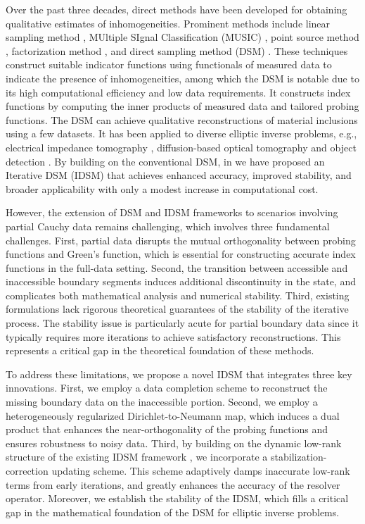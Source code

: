 \documentclass[onefignum,onetabnum]{siamart190516}
\numberwithin{equation}{section}
\begin{document}
Over the past three decades, direct methods have been developed for obtaining qualitative estimates of inhomogeneities.
Prominent methods include linear sampling method \cite{Kirsch1996}, MUltiple SIgnal Classification (MUSIC) \cite{AmmariCalmon:2008,Devaney2004,AmmariLesselier:2005}, point source method \cite{Potthast1998}, factorization method \cite{Kirsch1998}, and direct sampling method (DSM) \cite{ItoJinZou:2012}.
These techniques construct suitable indicator functions using functionals of measured data to indicate the presence of inhomogeneities, among which the DSM is notable due to its high computational efficiency and low data requirements.
It constructs index functions by computing the inner products of measured data and tailored probing functions. The DSM can achieve qualitative reconstructions of material inclusions using a few datasets.
It has been applied to diverse elliptic inverse problems, e.g., electrical impedance tomography \cite{Zou2014}, diffusion-based optical tomography \cite{Zou2015} and object detection \cite{Sun2023}.
By building on the conventional DSM, {in \cite{Ito2025Iterative}} we have proposed an Iterative DSM (IDSM) that achieves enhanced accuracy, improved stability, and broader applicability with only a modest increase in computational cost.

However, the extension of DSM and IDSM frameworks to scenarios involving partial Cauchy data remains challenging, which involves three fundamental challenges.
First, partial data disrupts the mutual orthogonality between probing functions and Green's function, which is essential for constructing accurate index functions in the full-data setting.
Second, the transition between accessible and inaccessible boundary segments induces additional discontinuity in the state, and complicates both mathematical analysis and numerical stability.
Third, existing formulations lack rigorous theoretical guarantees of the stability of the iterative process.
{The stability issue is particularly acute for partial boundary data since it typically requires more iterations to achieve satisfactory reconstructions.}
This represents a critical gap in the theoretical foundation of these methods.

To address these limitations, we propose a novel IDSM that integrates three key innovations.
First, we employ a data completion scheme to reconstruct the missing boundary data on the inaccessible portion. %
Second, we employ a heterogeneously regularized Dirichlet-to-Neumann map, which induces a dual product that enhances the near-orthogonality of the probing functions and ensures robustness to noisy data.
Third, by building on the dynamic low-rank structure of the existing IDSM framework \cite{Ito2025Iterative}, we incorporate a stabilization-correction updating scheme.
This scheme adaptively damps inaccurate low-rank terms from early iterations, and greatly enhances the accuracy of the resolver operator.
Moreover, we establish the stability of the IDSM, which fills a critical gap in the mathematical foundation of the DSM for elliptic inverse problems.
\end{document}
